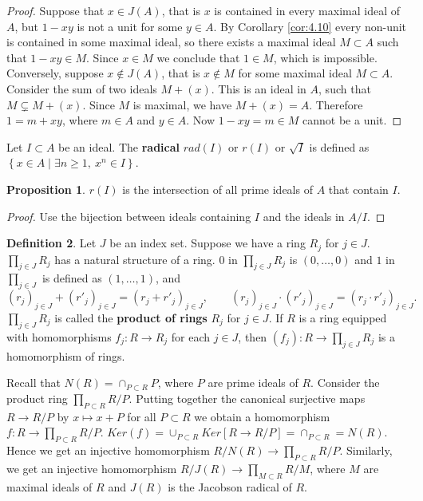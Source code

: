 \documentclass{article}
\newcommand{\rb}[1]{\left( #1 \right)}
\renewcommand{\sb}[1]{\left[ #1 \right]}
\newcommand{\cb}[1]{\left\{ #1 \right\}}
\theoremstyle{definition}\newtheorem{definition}{Definition}[section]
\theoremstyle{definition}\newtheorem{remark}[definition]{Remark}
\theoremstyle{definition}\newtheorem*{example}{Example}
\theoremstyle{definition}\newtheorem*{note}{Note}
\newtheorem{proposition}[definition]{Proposition}
\begin{document}
\begin{proof}
Suppose that $ x \in J\rb{A} $, that is $ x $ is contained in every maximal ideal of $ A $, but $ 1 - xy $ is not a unit for some $ y \in A $. By Corollary \ref{cor:4.10} every non-unit is contained in some maximal ideal, so there exists a maximal ideal $ M \subset A $ such that $ 1 - xy \in M $. Since $ x \in M $ we conclude that $ 1 \in M $, which is impossible. Conversely, suppose $ x \notin J\rb{A} $, that is $ x \notin M $ for some maximal ideal $ M \subset A $. Consider the sum of two ideals $ M + \rb{x} $. This is an ideal in $ A $, such that $ M \subsetneq M + \rb{x} $. Since $ M $ is maximal, we have $ M + \rb{x} = A $. Therefore $ 1 = m + xy $, where $ m \in A $ and $ y \in A $. Now $ 1 - xy = m \in M $ cannot be a unit.
\end{proof}

Let $ I \subset A $ be an ideal. The \textbf{radical} $ rad\rb{I} $ or $ r\rb{I} $ or $ \sqrt{I} $ is defined as $ \cb{x \in A \mid \exists n \ge 1, \ x^n \in I} $.

\begin{proposition}
$ r\rb{I} $ is the intersection of all prime ideals of $ A $ that contain $ I $.
\end{proposition}

\begin{proof}
Use the bijection between ideals containing $ I $ and the ideals in $ A / I $.
\end{proof}


\begin{definition}
Let $ J $ be an index set. Suppose we have a ring $ R_j $ for $ j \in J $. $ \prod_{j \in J} R_j $ has a natural structure of a ring. $ 0 $ in $ \prod_{j \in J} R_j $ is $ \rb{0, \dots, 0} $ and $ 1 $ in $ \prod_{j \in J} $ is defined as $ \rb{1, \dots, 1} $, and
$$ \rb{r_j}_{j \in J} + \rb{r'_j}_{j \in J} = \rb{r_j + r'_j}_{j \in J}, \qquad \rb{r_j}_{j \in J} \cdot \rb{r'_j}_{j \in J} = \rb{r_j \cdot r'_j}_{j \in J}. $$
$ \prod_{j \in J} R_j $ is called the \textbf{product of rings} $ R_j $ for $ j \in J $. If $ R $ is a ring equipped with homomorphisms $ f_j : R \to R_j $ for each $ j \in J $, then $ \rb{f_j} : R \to \prod_{j \in J} R_j $ is a homomorphism of rings.
\end{definition}

Recall that $ N\rb{R} = \cap_{P \subset R} P $, where $ P $ are prime ideals of $ R $. Consider the product ring $ \prod_{P \subset R} R / P $. Putting together the canonical surjective maps $ R \to R / P $ by $ x \mapsto x + P $ for all $ P \subset R $ we obtain a homomorphism $ f : R \to \prod_{P \subset R} R / P $. $ Ker\rb{f} = \cup_{P \subset R} Ker\sb{R \to R / P} = \cap_{P \subset R} = N\rb{R} $. Hence we get an injective homomorphism $ R / N\rb{R} \to \prod_{P \subset R} R / P $. Similarly, we get an injective homomorphism $ R / J\rb{R} \to \prod_{M \subset R} R / M $, where $ M $ are maximal ideals of $ R $ and $ J\rb{R} $ is the Jacobson radical of $ R $.
\end{document}
